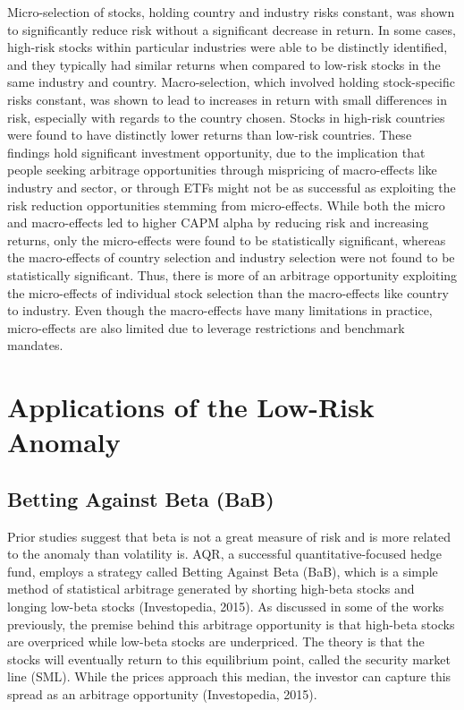 \documentclass[12pt,twoside]{reedthesis}
\theoremstyle{definition}
\theoremstyle{definition}
\theoremstyle{definition}
\theoremstyle{remark}
\begin{document}
Micro-selection of stocks, holding country and industry risks constant,
was shown to significantly reduce risk without a significant decrease in
return. In some cases, high-risk stocks within particular industries
were able to be distinctly identified, and they typically had similar
returns when compared to low-risk stocks in the same industry and
country. Macro-selection, which involved holding stock-specific risks
constant, was shown to lead to increases in return with small
differences in risk, especially with regards to the country chosen.
Stocks in high-risk countries were found to have distinctly lower
returns than low-risk countries. These findings hold significant
investment opportunity, due to the implication that people seeking
arbitrage opportunities through mispricing of macro-effects like
industry and sector, or through ETFs might not be as successful as
exploiting the risk reduction opportunities stemming from micro-effects.
While both the micro and macro-effects led to higher CAPM alpha by
reducing risk and increasing returns, only the micro-effects were found
to be statistically significant, whereas the macro-effects of country
selection and industry selection were not found to be statistically
significant. Thus, there is more of an arbitrage opportunity exploiting
the micro-effects of individual stock selection than the macro-effects
like country to industry. Even though the macro-effects have many
limitations in practice, micro-effects are also limited due to leverage
restrictions and benchmark mandates.

\section{Applications of the Low-Risk
Anomaly}\label{applications-of-the-low-risk-anomaly}

\subsection{Betting Against Beta (BaB)}\label{betting-against-beta-bab}

Prior studies suggest that beta is not a great measure of risk and is
more related to the anomaly than volatility is. AQR, a successful
quantitative-focused hedge fund, employs a strategy called Betting
Against Beta (BaB), which is a simple method of statistical arbitrage
generated by shorting high-beta stocks and longing low-beta stocks
(Investopedia, 2015). As discussed in some of the works previously, the
premise behind this arbitrage opportunity is that high-beta stocks are
overpriced while low-beta stocks are underpriced. The theory is that the
stocks will eventually return to this equilibrium point, called the
security market line (SML). While the prices approach this median, the
investor can capture this spread as an arbitrage opportunity
(Investopedia, 2015).
\end{document}
